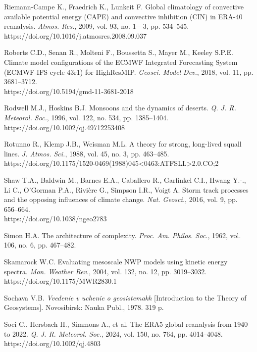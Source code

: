 \documentclass[12pt,a4paper]{article}
\begin{document}
\noindent Riemann-Campe K., Fraedrich K., Lunkeit F. Global climatology of convective available potential energy (CAPE) and convective inhibition (CIN) in ERA-40 reanalysis. \textit{Atmos. Res.}, 2009, vol. 93, no. 1––3, pp. 534–545.\\ https://doi.org/10.1016/j.atmosres.2008.09.037

\noindent Roberts C.D., Senan R., Molteni F., Boussetta S., Mayer M., Keeley S.P.E. Climate model configurations of the ECMWF Integrated Forecasting System (ECMWF-IFS cycle 43r1) for HighResMIP. \textit{Geosci. Model Dev.}, 2018, vol. 11, pp. 3681–3712.\\ https://doi.org/10.5194/gmd-11-3681-2018

\noindent Rodwell M.J., Hoskins B.J. Monsoons and the dynamics of deserts. \textit{Q. J. R. Meteorol. Soc.}, 1996, vol. 122, no. 534, pp. 1385–1404.\\ https://doi.org/10.1002/qj.49712253408

\noindent Rotunno R., Klemp J.B., Weisman M.L. A theory for strong, long-lived squall lines. \textit{J. Atmos. Sci.}, 1988, vol. 45, no. 3, pp. 463–485.\\ https://doi.org/10.1175/1520-0469(1988)045<0463:ATFSLL>2.0.CO;2

\noindent Shaw T.A., Baldwin M., Barnes E.A., Caballero R., Garfinkel C.I., Hwang Y.-., Li C., O'Gorman P.A., Rivi\`ere G., Simpson I.R., Voigt A. Storm track processes and the opposing influences of climate change. \textit{Nat. Geosci.}, 2016, vol. 9, pp. 656–664.\\ https://doi.org/10.1038/ngeo2783

\noindent Simon H.A. The architecture of complexity. \textit{Proc. Am. Philos. Soc.}, 1962, vol. 106, no. 6, pp. 467–482.

\noindent Skamarock W.C. Evaluating mesoscale NWP models using kinetic energy spectra. \textit{Mon. Weather Rev.}, 2004, vol. 132, no. 12, pp. 3019–3032.\\ https://doi.org/10.1175/MWR2830.1

\noindent Sochava V.B. \textit{Vvedenie v uchenie o geosistemakh} [Introduction to the Theory of Geosystems]. Novosibirsk: Nauka Publ., 1978. 319 p.

\noindent Soci C., Hersbach H., Simmons A., et al. The ERA5 global reanalysis from 1940 to 2022. \textit{Q. J. R. Meteorol. Soc.}, 2024, vol. 150, no. 764, pp. 4014–4048.\\ https://doi.org/10.1002/qj.4803
\end{document}
